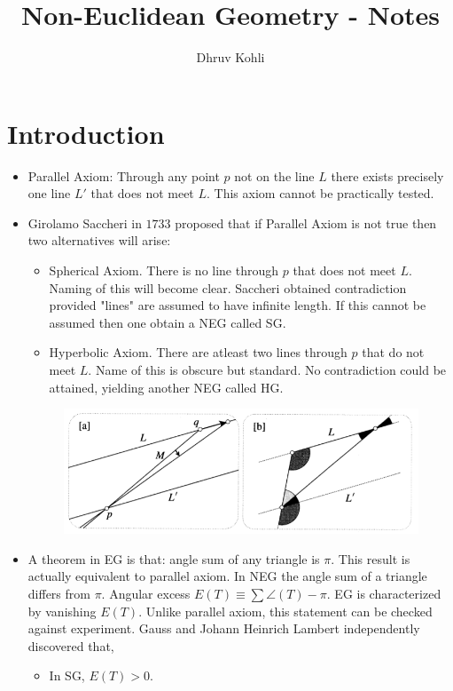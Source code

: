 \documentclass[12pt]{article}
\begin{document}
    
\title{Non-Euclidean Geometry - Notes}
\author{Dhruv Kohli}
\maketitle
\section{Introduction}
\begin{itemize}
    \item Parallel Axiom: Through any point $p$ not on the line $L$ there exists precisely one line $L'$ that does not meet $L$. This axiom cannot be practically tested.

    \item Girolamo Saccheri in $1733$ proposed that if Parallel Axiom is not true then two alternatives will arise:
    \begin{itemize}
        \item Spherical Axiom. There is no line through $p$ that does not meet $L$. Naming of this will become clear. Saccheri obtained contradiction provided "lines" are assumed to have infinite length. If this cannot be assumed then one obtain a NEG called SG.

        \item Hyperbolic Axiom. There are atleast two lines through $p$ that do not meet $L$. Name of this is obscure but standard. No contradiction could be attained, yielding another NEG called HG.
    \end{itemize}

    \begin{figure}[h!]
        \centering
        \includegraphics[scale=0.7]{fig_1}
        \label{fig_1}
    \end{figure}

    \item A theorem in EG is that: angle sum of any triangle is $\pi$. This result is actually equivalent to parallel axiom. In NEG the angle sum of a triangle differs from $\pi$. Angular excess $E(T) \equiv \sum\angle(T) - \pi$. EG is characterized by vanishing $E(T)$. Unlike parallel axiom, this statement can be checked against experiment. Gauss and Johann Heinrich Lambert independently discovered that,
    \begin{itemize}
        \item In SG, $E(T) > 0$.


\end{itemize}
\end{itemize}
\end{document}
